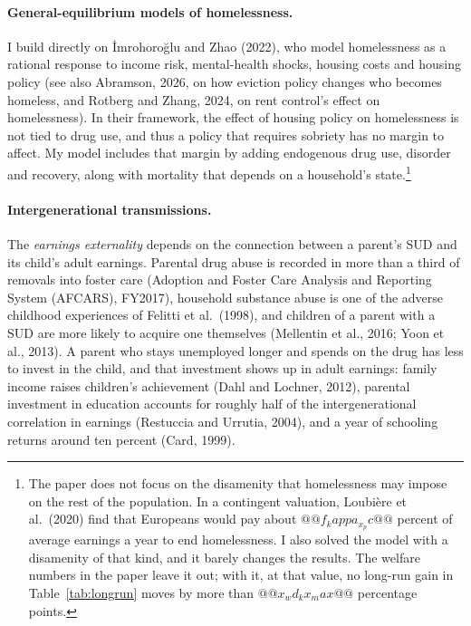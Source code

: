 \documentclass[10pt]{article}
\begin{document}
\paragraph{General-equilibrium models of homelessness.} I build directly on
\.{I}mrohoro\u{g}lu and Zhao (2022), who model homelessness as a rational
response to income risk, mental-health shocks, housing costs and housing policy (see also Abramson, 2026, on how eviction policy changes who becomes homeless, and Rotberg and Zhang, 2024, on rent control's effect on homelessness).
  In their framework, the effect of housing policy on homelessness is not tied to drug use, and thus a policy that requires sobriety has no margin to affect. My model includes that margin by adding endogenous drug use, disorder and recovery, along with mortality that depends on a household's state.\footnote{\label{fn:kappax}The paper does not focus on the disamenity that homelessness may impose on the rest of the population. In a contingent valuation, Loubi\`ere et al.\ (2020) find that Europeans would pay about $@@f_kappa_x_pc@@$ percent of average earnings a year to end homelessness. I also solved the model with a disamenity of that kind, and it barely changes the results. The welfare numbers in the paper leave it out; with it, at that value, no long-run gain in Table~\ref{tab:longrun} moves by more than $@@x_wd_kx_max@@$ percentage points.}

\paragraph{Intergenerational transmissions.}  The \emph{earnings externality} depends on the connection between a parent's SUD and its child's adult earnings. Parental drug abuse is recorded in more than a third of removals into foster care (Adoption and Foster Care Analysis and Reporting System (AFCARS), FY2017), household substance abuse is one of the adverse childhood experiences of Felitti et al.\ (1998), and children of a parent with a SUD are more likely to acquire one themselves (Mellentin et al., 2016; Yoon et al., 2013). A parent who stays unemployed longer and spends on the drug has less to invest in the child, and that investment shows up in adult earnings: family income raises children's achievement (Dahl and Lochner, 2012), parental investment in education accounts for roughly half of the intergenerational correlation in earnings (Restuccia and Urrutia, 2004), and a year of schooling returns around ten percent (Card, 1999).
\end{document}
